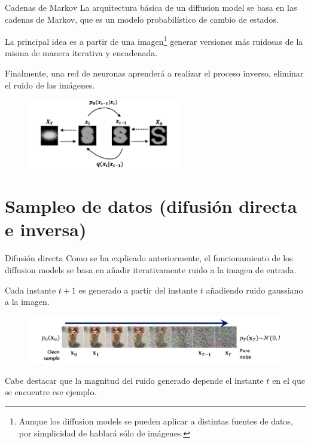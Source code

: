 \begin{frame}{Cadenas de Markov}
La arquitectura básica de un diffusion model se basa en las \alert{cadenas de Markov}, que es un modelo probabilístico de cambio de estados.

La principal idea es a partir de una imagen\footnote{Aunque los diffusion models se pueden aplicar a distintas fuentes de datos, por simplicidad de hablará sólo de imágenes.} generar \alert{versiones más ruidosas} de la misma de manera iterativa y encadenada.

Finalmente, una \alert{red de neuronas} aprenderá a realizar el proceso inverso, eliminar el ruido de las imágenes.

\begin{figure}
    \centering
    \includegraphics[width=0.6\textwidth]{Slides/figures/Diffusion_Models/DifussionModel_Basic.png}
    \caption{\cite{DifussionModel_Basic}}
\end{figure}
\end{frame}

\section{Sampleo de datos (difusión directa e inversa)}

\begin{frame}{Difusión directa}
Como se ha explicado anteriormente, el funcionamiento de los diffusion models se basa en añadir iterativamente \alert{ruido} a la imagen de entrada.

Cada instante $t+1$ es generado a partir del instante $t$ añadiendo \alert{ruido gaussiano} a la imagen.

\begin{figure}
    \centering
    \includegraphics[width=\textwidth]{Slides/figures/Diffusion_Models/Noising_Process.png}
    \caption{\cite{vahdat2022improving}}
\end{figure}

Cabe destacar que la \alert{magnitud} del ruido generado depende el instante \alert{$t$} en el que se encuentre ese ejemplo.
\end{frame}

